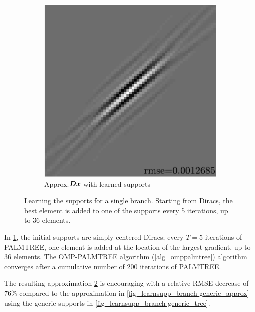 \begin{figure}[!ht]
\begin{subfigure}[b]{0.085\textwidth}
\caption{}\label{fig_learnsupp_branch-learned_tree}
\end{subfigure}
\begin{subfigure}[b]{0.39\textwidth}\centering
\includegraphics[width=\textwidth]{figures/variable_support/xp_128x128_sc2_angl1_K3_S3_node4_variable_approx.pdf}
\caption{Approx.\@ $\bm{D}\bm{x}$ with learned supports}\label{fig_learnsupp_branch-learned_approx}
\end{subfigure}
\caption{Learning the supports for a single branch. Starting from Diracs, the best element is added to one of the supports every 5 iterations, up to 36 elements.}\label{fig_learnsupp_branch}
\end{figure}

\noindent
In \cref{fig_learnsupp_branch-learned_tree}, the initial supports are simply centered Diracs; every $T=5$ iterations of \ac{PALMTREE}, one element is added at the location of the largest gradient, up to 36 elements. The OMP-PALMTREE algorithm (\cref{alg_omppalmtree}) algorithm converges after a cumulative number of 200 iterations of \ac{PALMTREE}.

\noindent
The resulting approximation \cref{fig_learnsupp_branch-learned_approx} is encouraging with a relative RMSE decrease of 76\% compared to the approximation in \cref{fig_learnsupp_branch-generic_approx} using the generic supports in \cref{fig_learnsupp_branch-generic_tree}.


